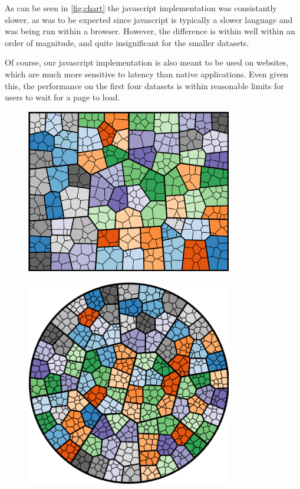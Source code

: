 \documentclass{acm_proc_article-sp} \usepackage{cite}
\begin{document}
As can be seen in \ref{fig:chart} the javascript implementation was
consistantly slower, as was to be expected since javascript is
typically a slower language and was being run within a
browser. However, the difference is within well within an order of
magnitude, and quite insignificant for the smaller datasets.

Of course, our javascript implementation is also meant to be used on
websites, which are much more sensitive to latency than native
applications. Even given this, the performance on the first four
datasets is within reasonable limits for users to wait for a page to
load.

\begin{figure}
\centering \includegraphics[width=90mm]{source-images/random-10-3-025-rect.png}
\caption{}
\end{figure}
\begin{figure}
\centering \includegraphics[width=90mm]{source-images/random-10-3-000-circle.png}
\caption{}
\end{figure}
\end{document}
